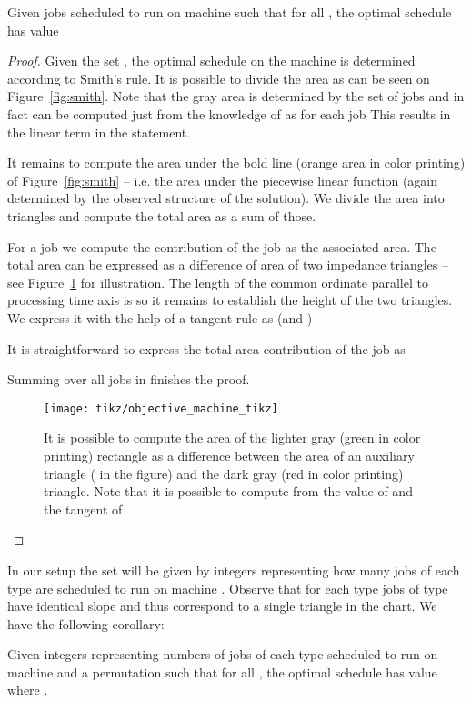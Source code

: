 \documentclass{llncs}
\begin{document}
\begin{lemma}\label{lem:chartArea}
Given jobs  scheduled to run on machine  such that  for all , the optimal schedule has value 

\end{lemma}
\begin{proof}
Given the set , the optimal schedule on the machine  is determined according to Smith's rule. It is possible to divide the area as can be seen on Figure~\ref{fig:smith}. Note that the gray area is determined by the set of jobs  and in fact can be computed just from the knowledge of  as  for each job  This results in the linear term in the statement.

It remains to compute the area under the bold line (orange area in color printing) of Figure~\ref{fig:smith} -- i.e. the area under the piecewise linear function (again determined by the observed structure of the solution). We divide the area into triangles and compute the total area as a sum of those.

For a job  we compute the contribution of the job as the associated area. The total area can be expressed as a difference of area of two impedance triangles -- see Figure~\ref{fig:geometry} for illustration. The length of the common ordinate parallel to processing time axis is  so it remains to establish the height  of the two triangles. We express it with the help of a tangent rule as  (and )

It is straightforward to express the total area contribution of the job  as 

Summing over all jobs in  finishes the proof.

\begin{figure}[bt]
\texttt{[image: tikz/objective\_machine\_tikz]}
\caption{It is possible to compute the area of the lighter gray (green in color printing) rectangle as a difference between the area of an auxiliary triangle ( in the figure) and the dark gray (red in color printing) triangle. Note that it is possible to compute  from the value of  and the tangent of }\label{fig:geometry}
\end{figure}
\end{proof}

In our setup the set  will be given by integers  representing how many jobs of each type are scheduled to run on machine . Observe that for each type  jobs of type  have identical slope  and thus correspond to a single triangle in the chart. We have the following corollary:

\begin{corollary}\label{cor:separable_convex}
Given integers  representing numbers of jobs of each type scheduled to run on machine  and a permutation  such that  for all , the optimal schedule has value  where .
\end{corollary}
\end{document}
